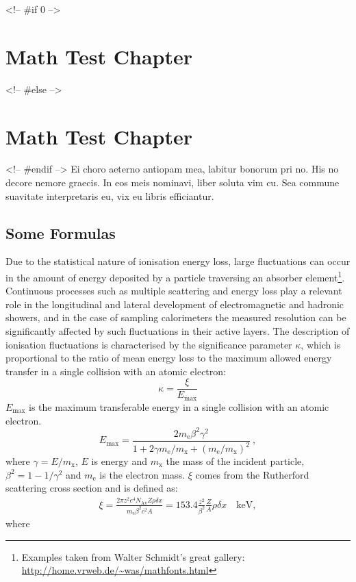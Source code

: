 <!-- #if 0 -->
\chapter{Math Test Chapter}\label{ch:mathtest} %
<!-- #else -->
\chapter{Math Test Chapter}\label{ch:mathtest}
<!-- #endif -->
Ei choro aeterno antiopam mea, labitur bonorum pri no. His no decore
nemore graecis. In eos meis nominavi, liber soluta vim cu. Sea commune
suavitate interpretaris eu, vix eu libris efficiantur.

\section{Some Formulas}
Due to the statistical nature of ionisation energy loss, large
fluctuations can occur in the amount of energy deposited by a particle
traversing an absorber element\footnote{Examples taken from Walter
Schmidt's great gallery: \\
\url{http://home.vrweb.de/~was/mathfonts.html}}.  Continuous processes
such as multiple
scattering and energy loss play a relevant role in the longitudinal
and lateral development of electromagnetic and hadronic
showers, and in the case of sampling calorimeters the
measured resolution can be significantly affected by such fluctuations
in their active layers.  The description of ionisation fluctuations is
characterised by the significance parameter $\kappa$, which is
proportional to the ratio of mean energy loss to the maximum allowed
energy transfer in a single collision with an atomic electron:
\begin{equation}
\kappa =\frac{\xi}{E_{\textrm{max}}} %
\end{equation}
$E_{\textrm{max}}$ is the maximum transferable energy in a single
collision with an atomic electron.
\begin{equation*}
E_{\textrm{max}} =\frac{2 m_{\textrm{e}} \beta^2\gamma^2 }{1 +
2\gamma m_{\textrm{e}}/m_{\textrm{x}} + \left ( m_{\textrm{e}}
/m_{\textrm{x}}\right)^2}\ ,
\end{equation*}
where $\gamma = E/m_{\textrm{x}}$, $E$ is energy and
$m_{\textrm{x}}$ the mass of the incident particle,
$\beta^2 = 1 - 1/\gamma^2$ and $m_{\textrm{e}}$ is the electron mass.
$\xi$ comes from the Rutherford scattering cross section
and is defined as:
\begin{eqnarray*} \xi  = \frac{2\pi z^2 e^4 N_{\textrm{Av}} Z \rho
\delta x}{m_{\textrm{e}} \beta^2 c^2 A} =  153.4 \frac{z^2}{\beta^2}
\frac{Z}{A}
  \rho \delta x \quad\textrm{keV},
\end{eqnarray*}
where

